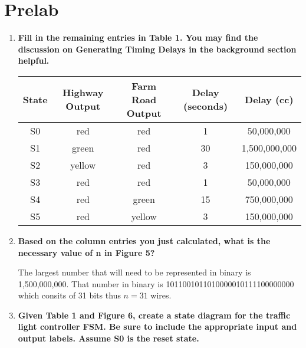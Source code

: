 \documentclass[a4paper,12pt]{article}
\begin{document}
\section*{Prelab}
\begin{enumerate}
  \item \textbf{Fill in the remaining entries in Table 1. You may find the discussion on Generating Timing Delays in the background section helpful.}
  
    \begin{center}
      \begin{tabular}{|c||c|c|c|c|}
         \hline
         State & Highway Output & Farm Road Output & Delay (seconds) & Delay (cc) \\
         \hline
         \hline
         S0 & red & red & 1 & 50,000,000\\
         \hline
         S1 & green & red & 30 & 1,500,000,000\\
         \hline
         S2 & yellow & red & 3 & 150,000,000\\
         \hline
         S3 & red & red & 1 & 50,000,000\\
         \hline
         S4 & red & green & 15 & 750,000,000\\
         \hline
         S5 & red & yellow & 3 & 150,000,000\\
         \hline
      \end{tabular}
    \end{center}
  
  \item \textbf{Based on the column entries you just calculated, what is the necessary value of n in Figure 5?}
  
  The largest number that will need to be represented in binary is 1,500,000,000. That number in binary is 1011001011010000010111100000000 which consits of 31 bits thus $n=31$ wires.
  
  \item \textbf{Given Table 1 and Figure 6, create a state diagram for the traffic light controller FSM. Be sure to include the appropriate input and output labels. Assume S0 is the reset state.}
  

\end{enumerate}
\end{document}
